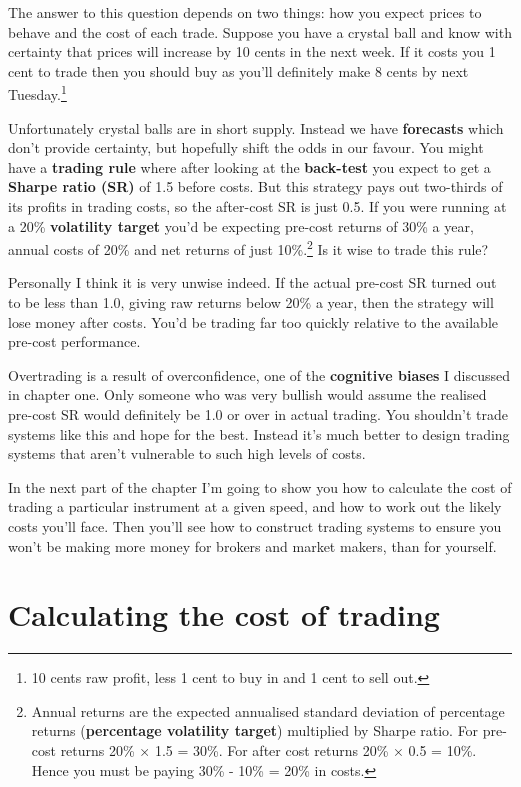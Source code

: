The answer to this question depends on two things: how you expect prices to behave and the cost of each trade. Suppose you have a crystal ball and know with certainty that prices will increase by 10 cents in the next week. If it costs you 1 cent to trade then you should buy as you'll definitely make 8 cents by next Tuesday.\footnote{10 cents raw profit, less 1 cent to buy in and 1 cent to sell out.}

Unfortunately crystal balls are in short supply. Instead we have \textbf{forecasts} which don't provide certainty, but hopefully shift the odds in our favour. You might have a \textbf{trading rule} where after looking at the \textbf{back-test} you expect to get a \textbf{Sharpe ratio (SR)} of 1.5 before costs. But this strategy pays out two-thirds of its profits in trading costs, so the after-cost SR is just 0.5. If you were running at a 20\% \textbf{volatility target} you'd be expecting pre-cost returns of 30\% a year, annual costs of 20\% and net returns of just 10\%.\footnote{Annual returns are the expected annualised standard deviation of percentage returns (\textbf{percentage volatility target}) multiplied by Sharpe ratio. For pre-cost returns 20\% × 1.5 = 30\%. For after cost returns 20\% × 0.5 = 10\%. Hence you must be paying 30\% - 10\% = 20\% in costs.} Is it wise to trade this rule?

Personally I think it is very unwise indeed. If the actual pre-cost SR turned out to be less than 1.0, giving raw returns below 20\% a year, then the strategy will lose money after costs. You'd be trading far too quickly relative to the available pre-cost performance.

Overtrading is a result of overconfidence, one of the \textbf{cognitive biases} I discussed in chapter one. Only someone who was very bullish would assume the realised pre-cost SR would definitely be 1.0 or over in actual trading. You shouldn't trade systems like this and hope for the best. Instead it's much better to design trading systems that aren't vulnerable to such high levels of costs.

In the next part of the chapter I'm going to show you how to calculate the cost of trading a particular instrument at a given speed, and how to work out the likely costs you'll face. Then you'll see how to construct trading systems to ensure you won't be making more money for brokers and market makers, than for yourself.

\section*{Calculating the cost of trading}  {}


